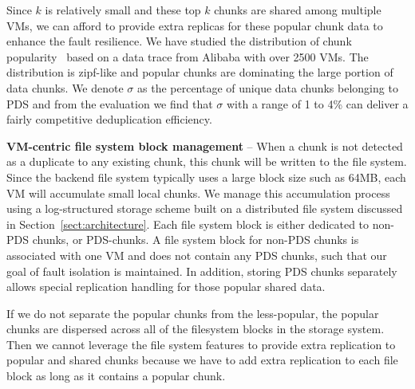 Since $k$ is relatively small and these top $k$ chunks are shared among multiple VMs, 
we can afford to provide extra replicas for these popular chunk data to enhance the fault resilience.
We have studied the distribution of chunk popularity~\cite{WeiZhangIEEE} 
based on a data trace from Alibaba with over 2500 VMs.
The distribution is zipf-like and popular chunks are dominating the large portion of data chunks.
We denote $\sigma$ as the percentage of unique data chunks belonging to PDS and from the evaluation we find that
$\sigma$ with a range of 1 to 4\% can deliver a fairly competitive deduplication efficiency.


\textbf{VM-centric file system block management} --
When a chunk is not detected as a duplicate to any existing chunk, this chunk will be written
to the file system. Since the backend file system typically uses a large block size such as 64MB, each VM will 
accumulate small local chunks. We manage this accumulation process using a log-structured storage scheme built
on a distributed file system discussed in Section~\ref{sect:architecture}.
Each file system block is either dedicated to non-PDS chunks, or PDS-chunks.
A file system block for non-PDS chunks is associated with one VM and does not contain
any PDS chunks, such that our goal of fault isolation is maintained.
In addition, storing PDS chunks separately allows special replication handling for those popular shared data. 


If we do not separate the
popular chunks from the less-popular, the popular chunks are dispersed across
all of the filesystem blocks in the storage system.  Then we cannot leverage the file system features to 
provide extra replication to popular and shared chunks because  
we have to add extra replication to each file block as long as it contains a popular chunk.


